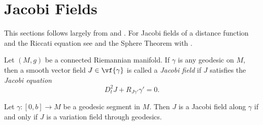 


\section{Jacobi Fields}

\begin{tcolorbox}
This sections follows largely from \cite{lee2006riemannian} and \cite{sakai1996riemannian}.  For Jacobi fields of a distance function and the Riccati equation see \cite{meyer1989toponogov} and the Sphere Theorem with \cite{safeer2016study}.
\end{tcolorbox}


Let $(M,g)$ be a connected Riemannian manifold.  If $\gamma$ is any geodesic on $M$, then a smooth vector field $J\in\vf{\gamma}$ is called a \textit{Jacobi field} if $J$ satisfies the \textit{Jacobi equation}
$$D_t^2J+R_{J\gamma'}\gamma'=0.$$


\begin{thm}
Let $\gamma:[0,b]\to M$ be a geodesic segment in $M$.  Then $J$ is a Jacobi field along $\gamma$ if and only if $J$ is a variation field through geodesics.
\end{thm}


